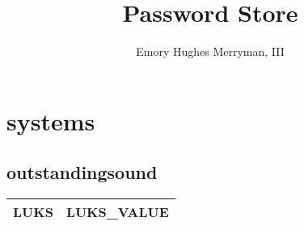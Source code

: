 \documentclass{article}
\begin{document}
\title{Password Store}
\author{Emory Hughes Merryman, III}
\maketitle
\section{systems}
\subsection{outstandingsound}

\begin{tabular}{||c|p{10cm}||}
  \hline
  LUKS & LUKS_VALUE \\ \hline
  \hline
\end{tabular}
\end{document}
